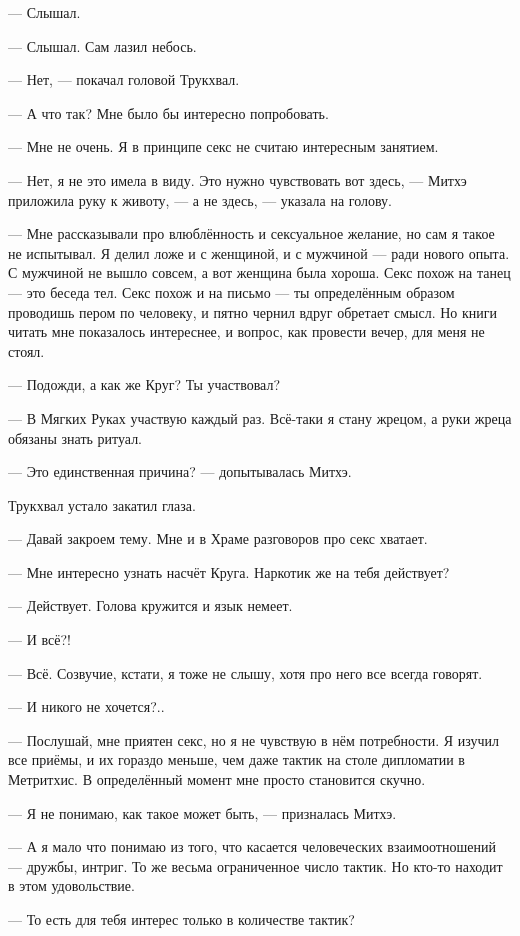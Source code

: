 --- Слышал.

--- Слышал.
Сам лазил небось.

--- Нет, --- покачал головой Трукхвал.

--- А что так?
Мне было бы интересно попробовать.

--- Мне не очень.
Я в принципе секс не считаю интересным занятием.

--- Нет, я не это имела в виду.
Это нужно чувствовать вот здесь, --- Митхэ приложила руку к животу, --- а не здесь, --- указала на голову.

--- Мне рассказывали про влюблённость и сексуальное желание, но сам я такое не испытывал.
Я делил ложе и с женщиной, и с мужчиной --- ради нового опыта.
С мужчиной не вышло совсем, а вот женщина была хороша.
Секс похож на танец --- это беседа тел.
Секс похож и на письмо --- ты определённым образом проводишь пером по человеку, и пятно чернил вдруг обретает смысл.
Но книги читать мне показалось интереснее, и вопрос, как провести вечер, для меня не стоял.

--- Подожди, а как же Круг?
Ты участвовал?

--- В Мягких Руках участвую каждый раз.
Всё-таки я стану жрецом, а руки жреца обязаны знать ритуал.

--- Это единственная причина? --- допытывалась Митхэ.

Трукхвал устало закатил глаза.

--- Давай закроем тему.
Мне и в Храме разговоров про секс хватает.

--- Мне интересно узнать насчёт Круга.
Наркотик же на тебя действует?

--- Действует.
Голова кружится и язык немеет.

--- И всё?!

--- Всё.
Созвучие, кстати, я тоже не слышу, хотя про него все всегда говорят.

--- И никого не хочется?..

--- Послушай, мне приятен секс, но я не чувствую в нём потребности.
Я изучил все приёмы, и их гораздо меньше, чем даже тактик на столе дипломатии в Метритхис.
В определённый момент мне просто становится скучно.

--- Я не понимаю, как такое может быть, --- призналась Митхэ.

--- А я мало что понимаю из того, что касается человеческих взаимоотношений --- дружбы, интриг.
То же весьма ограниченное число тактик.
Но кто-то находит в этом удовольствие.

--- То есть для тебя интерес только в количестве тактик?

